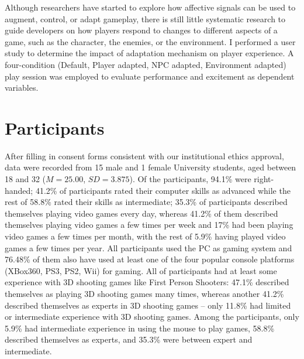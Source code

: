 
Although researchers have started to explore how affective signals can be used to augment, control, or adapt gameplay, there is still little systematic research to guide developers on how players respond to changes to different aspects of a game, such as the character, the enemies, or the environment. I performed a user study to determine the impact of adaptation mechanism on player experience. A four-condition (Default, Player adapted, NPC adapted, Environment adapted) play session was employed to evaluate performance and excitement as dependent variables.

\section{Participants}
After filling in consent forms consistent with our institutional ethics approval, data were recorded from 15 male and 1 female University students, aged between 18 and 32 ($M = 25.00$, $SD = 3.875$). Of the participants, 94.1\% were right-handed; 41.2\% of participants rated their computer skills as advanced while the rest of 58.8\% rated their skills as intermediate; 35.3\% of participants described themselves playing video games every day, whereas 41.2\% of them described themselves playing video games a few times per week and 17\% had been playing video games a few times per month, with the rest of 5.9\% having played video games a few times per year. All participants used the PC as gaming system and 76.48\% of them also have used at least one of the four popular console platforms (XBox360, PS3, PS2, Wii) for gaming. All of participants had at least some experience with 3D shooting games like First Person Shooters: 47.1\% described themselves as playing 3D shooting games many times, whereas another 41.2\% described themselves as experts in 3D shooting games – only 11.8\% had limited or intermediate experience with 3D shooting games. Among the participants, only 5.9\% had intermediate experience in using the mouse to play games, 58.8\% described themselves as experts, and 35.3\% were between expert and intermediate.

